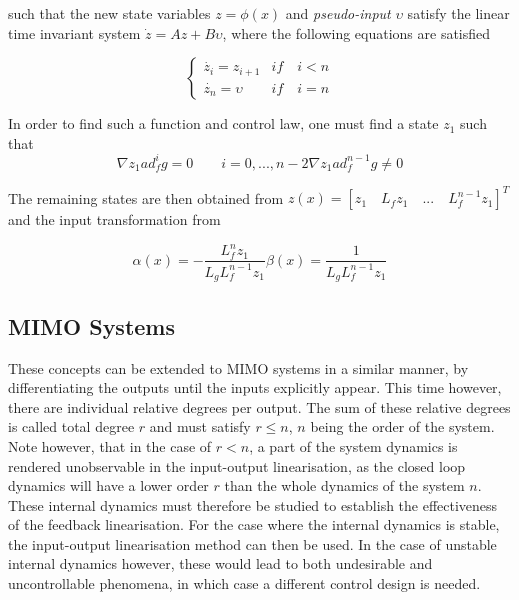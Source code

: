 such that the new state variables $z=\phi(x)$ and \emph{pseudo-input} $\upsilon$ satisfy the linear time invariant system $\dot{z} = Az+B\upsilon$, where the following equations are satisfied

\begin{equation}
	\begin{cases}
		\dot{z_i}=z_{i+1} & if\quad i<n\\
		\dot{z_n}=\upsilon & if\quad i=n
	\end{cases}
	\label{eq:SISO_state}
\end{equation}

In order to find such a function and control law, one must find a state $z_1$ such that 
\begin{subequations}
	\begin{equation}
		\nabla z_1 ad_f^ig=0 \qquad i=0, ..., n-2
	\end{equation}
	\begin{equation}
		\nabla z_1 ad_f^{n-1}g\neq 0
	\end{equation}
\end{subequations}

The remaining states are then obtained from $z(x) = [z_1 \quad L_fz_1 \quad ... \quad L_f^{n-1}z_1]^T$ and the input transformation from

\begin{subequations}
	\begin{equation}
		\alpha (x) = - \dfrac{L_f^nz_1}{L_gL_f^{n-1}z_1}
	\end{equation}
	\begin{equation}
		\beta (x) = \dfrac{1}{L_gL_f^{n-1}z_1}
	\end{equation}
\end{subequations}

\subsection{MIMO Systems}
\label{section:background/MIMO_NLI}

These concepts can be extended to MIMO systems in a similar manner, by differentiating the outputs until the inputs explicitly appear. This time however, there are individual relative degrees per output. The sum of these relative degrees is called total degree $r$ and must satisfy $r\leq n$, $n$ being the order of the system. Note however, that in the case of $r<n$, a part of the system dynamics is rendered unobservable in the input-output linearisation, as the closed loop dynamics will have a lower order $r$ than the whole dynamics of the system $n$. These internal dynamics must therefore be studied to establish the effectiveness of the feedback linearisation. For the case where the internal dynamics is stable, the input-output linearisation method can then be used. In the case of unstable internal dynamics however, these would lead to both undesirable and uncontrollable phenomena, in which case a different control design is needed.

